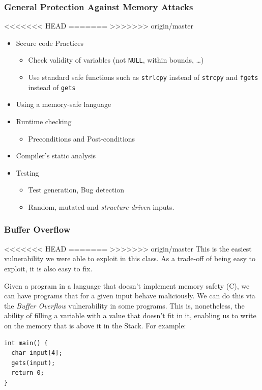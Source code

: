 \documentclass[11pt]{article}
\begin{document}
\subsubsection{General Protection Against Memory Attacks}
<<<<<<< HEAD
\label{sec:org64a5739}
=======
\label{sec:orgbe9cce9}
>>>>>>> origin/master
\begin{itemize}
\item Secure code Practices
\begin{itemize}
\item Check validity of variables (not \texttt{NULL}, within bounds, \ldots{})
\item Use standard safe functions such as \texttt{strlcpy} instead of \texttt{strcpy} and \texttt{fgets} instead of \texttt{gets}
\end{itemize}
\item Using a memory-safe language
\item Runtime checking
\begin{itemize}
\item Preconditions and Post-conditions
\end{itemize}
\item Compiler's static analysis
\item Testing
\begin{itemize}
\item Test generation, Bug detection
\item Random, mutated and \emph{structure-driven} inputs.
\end{itemize}
\end{itemize}

\subsubsection{Buffer Overflow}
<<<<<<< HEAD
\label{sec:orgdbbca5b}
=======
\label{sec:org88a93fc}
>>>>>>> origin/master
This is the easiest vulnerability we were able to exploit in this class. As a trade-off of being easy to exploit, it is also easy to fix.

Given a program in a language that doesn't implement memory safety (C), we can have programs that for a given input behave maliciously. We can do this via the \emph{Buffer Overflow} vulnerability in some programs. This is, nonetheless, the ability of filling a variable with a value that doesn't fit in it, enabling us to write on the memory that is above it in the Stack. For example:

\begin{verbatim}
int main() {
  char input[4];
  gets(input);
  return 0;
}
\end{verbatim}
\end{document}
